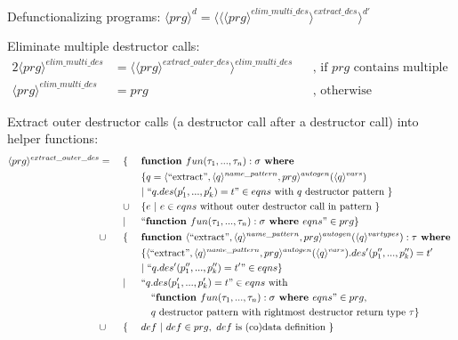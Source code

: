 \documentclass[11pt]{article} %
\begin{document}
Defunctionalizing programs: $\langle prg \rangle^d = \langle \langle \langle prg \rangle^{elim\_multi\_des} \rangle^{extract\_des} \rangle^{d'}$

Eliminate multiple destructor calls:
\begin{alignat*}{2}
\langle prg \rangle^{elim\_multi\_des} & = \langle \langle prg \rangle^{extract\_outer\_des} \rangle^{elim\_multi\_des} &&\textrm{, if } prg \textrm{ contains multiple destructor calls } \\
\langle prg \rangle^{elim\_multi\_des} & = prg &&\textrm{, otherwise}
\end{alignat*}

Extract outer destructor calls (a destructor call after a destructor call) into helper functions:
\begin{alignat*}{3}
\langle prg \rangle^{extract\_outer\_des} & = ~&&\{ ~&& \textrm{\textbf{function }} fun(\tau_1, ..., \tau_n):\sigma \textrm{\textbf{ where }} \\
& && && \{ q = \langle `` \textrm{extract} ", \langle q \rangle^{name\_pattern}, prg \rangle^{autogen}(\langle q \rangle^{vars}) \\
& && && | ~ `` q.des(p'_1, ..., p'_k) = t " \in eqns \textrm{ with } q \textrm{ destructor pattern } \} \\
& && \cup &&\{ e ~ | ~ e \in eqns \textrm{ without outer destructor call in pattern } \} \\
& && | && `` \textrm{\textbf{function }} fun(\tau_1, ..., \tau_n): \sigma \textrm{\textbf{ where }} eqns " \in prg \} \\
&\cup && \{ && \textrm{\textbf{function }} \langle `` \textrm{extract} ", \langle q \rangle^{name\_pattern}, prg \rangle^{autogen} (\langle q \rangle^{vartypes}): \tau \textrm{\textbf{ where }} \\
& && && \{ \langle `` \textrm{extract} ", \langle q \rangle^{name\_pattern}, prg \rangle^{autogen}(\langle q \rangle^{vars}).des'(p''_1, ..., p''_k) = t' \\
& && && | ~ `` q.des'(p''_1, ..., p''_k) = t' " \in eqns \} \\
& && | && ``q.des(p'_1, ..., p'_k) = t " \in eqns \textrm{ with }\\
& && &&\quad `` \textrm{\textbf{function }} fun(\tau_1, ..., \tau_n): \sigma \textrm{\textbf{ where }} eqns" \in prg,\\
& && &&\quad q \textrm{ destructor pattern with rightmost destructor return type } \tau \} \\
&\cup && \{ && def ~ | ~ def \in prg, ~ def \textrm{ is (co)data definition } \}
\end{alignat*}
\end{document}
